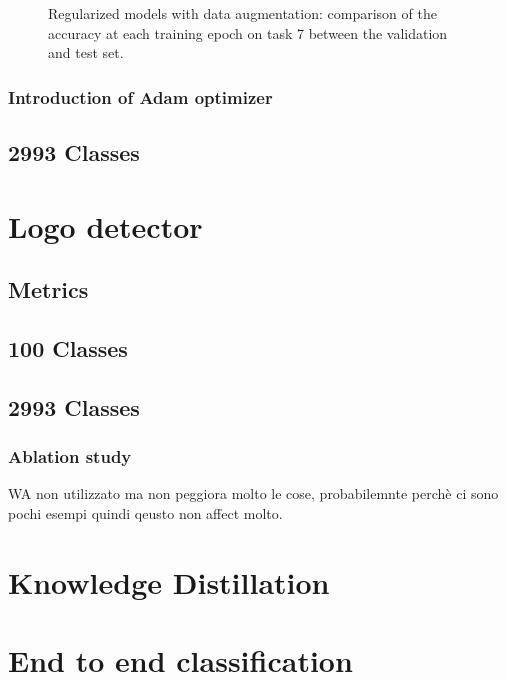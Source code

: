 \begin{figure}[H]
	\centering
	\caption{Regularized models with data augmentation: comparison of the accuracy at each training epoch on task 7 between the validation and test set.}%
	\label{fig:exp2-train_val}%
\end{figure}


\subsubsection{Introduction of Adam optimizer}

\subsection{2993 Classes}
\label{sec:whole_dataset_clf}
\section{Logo detector}
\label{sec:exp-det}
\subsection{Metrics}
\subsection{100 Classes}
\subsection{2993 Classes}
\subsubsection{Ablation study}
WA non utilizzato ma non peggiora molto le cose, probabilemnte perchè ci sono pochi esempi quindi qeusto non affect molto.

\section{Knowledge Distillation}
\label{sec:exp-kd}
\section{End to end classification}
\label{sec:exp-end2end}

